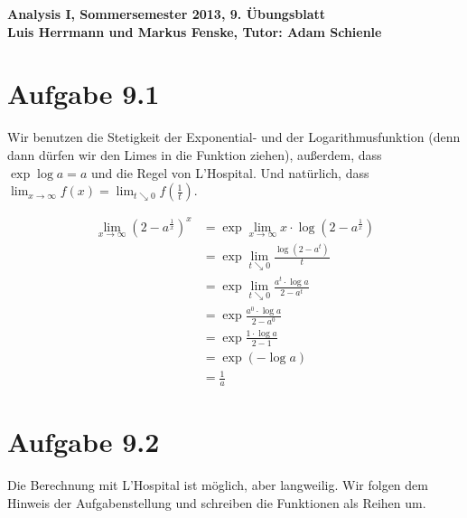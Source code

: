 \documentclass[a4paper,german,12pt,smallheadings]{scrartcl}
\begin{document}
\begin{center}
\bfseries %
\sffamily %
\vspace{-40pt}
Analysis I, Sommersemester 2013, 9. Übungsblatt \\
Luis Herrmann und Markus Fenske, Tutor: Adam Schienle
\vspace{-10pt}
\end{center}

\section*{Aufgabe 9.1}

Wir benutzen die Stetigkeit der Exponential- und der Logarithmusfunktion (denn
dann dürfen wir den Limes in die Funktion ziehen), außerdem, dass $\exp \log a
= a$ und die Regel von L'Hospital. Und natürlich, dass $\lim_{x \to \infty}
f(x) = \lim_{t \searrow 0} f\left(\frac{1}{t}\right)$.

\begin{align*}
  \lim_{x \to \infty} \left(2-a^\frac{1}{x}\right)^x &= \exp \lim_{x \to \infty} x \cdot \log \left(2-a^\frac{1}{x}\right) \\
  &= \exp \lim_{t \searrow 0} \frac{\log (2-a^t)}{t} \\
  &= \exp \lim_{t \searrow 0} \frac{a^t \cdot \log a}{2-a^t} \\
  &= \exp \frac{a^0 \cdot \log a}{2-a^0} \\
  &= \exp \frac{1 \cdot \log a}{2-1} \\
  &= \exp (-\log a) \\
  &= \frac{1}{a}
\end{align*}

\section*{Aufgabe 9.2}

Die Berechnung mit L'Hospital ist möglich, aber langweilig. Wir folgen dem
Hinweis der Aufgabenstellung und schreiben die Funktionen als Reihen um.
\end{document}
